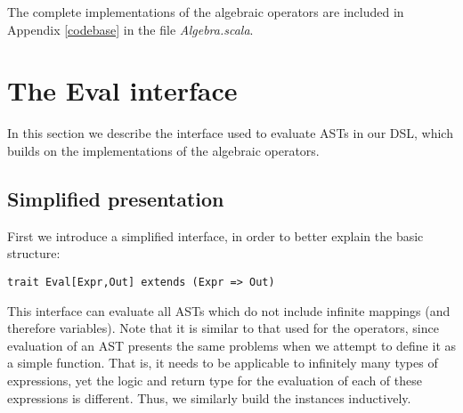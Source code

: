 The complete implementations of the algebraic operators are included in Appendix \ref{codebase} in the file \textit{Algebra.scala}.

\section{The Eval interface}
In this section we describe the interface used to evaluate ASTs in our DSL, which builds on the implementations of the algebraic operators.
\subsection{Simplified presentation}
First we introduce a simplified interface, in order to better explain the basic structure:
\begin{lstlisting}
trait Eval[Expr,Out] extends (Expr => Out)
\end{lstlisting}
This interface can evaluate all ASTs which do not include infinite mappings (and therefore variables). Note that it is similar to that used for the operators, since evaluation of an AST presents the same problems when we attempt to define it as a simple function. That is, it needs to be applicable to infinitely many types of expressions, yet the logic and return type for the evaluation of each of these expressions is different. Thus, we similarly build the instances inductively.

